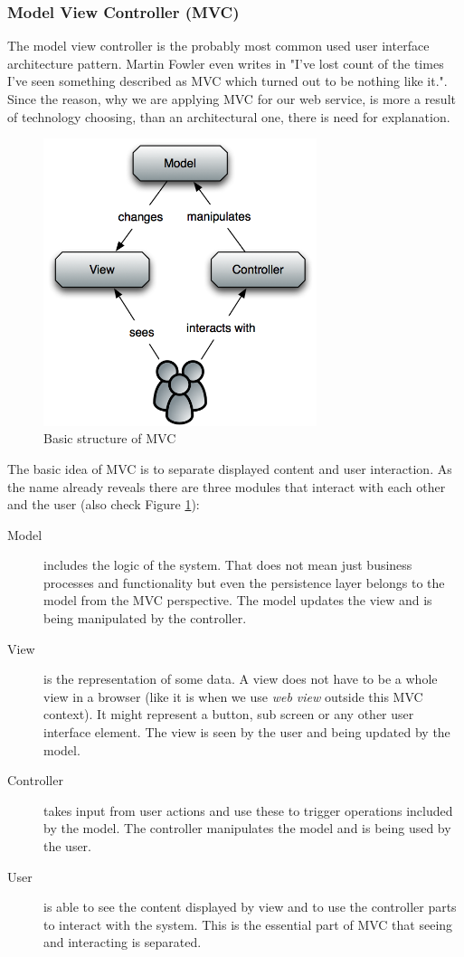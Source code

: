 \subsubsection*{Model View Controller (MVC)}
The model view controller is the probably most common used user interface architecture pattern. Martin Fowler even writes in \cite{fowler2006gui} "I've lost count of the times I've seen something described as MVC which turned out to be nothing like it.". Since the reason, why we are applying MVC for our web service, is more a result of technology choosing, than an architectural one, there is need for explanation.

\begin{figure}\centering
		\includegraphics[width=8cm]{images/mvc-expl.png}
		\caption{Basic structure of MVC}
		\label{mvc-expl}
\end{figure} 


The basic idea of MVC is to separate displayed content and user interaction. As the name already reveals there are three modules that interact with each other and the user (also check Figure \ref{mvc-expl}):

\begin{description}
\item[Model] includes the logic of the system. That does
 not
 mean just business processes and functionality but even the persistence layer belongs to the model from the MVC perspective. 
The model updates the view and is being manipulated by the controller.

\item[View] is the representation of some data. A view does
 not
 have to be a whole view in a browser (like it is when we use \emph{web view} outside this MVC context). It might represent a button, sub screen or any other user interface element.
The view is seen by the user and being updated by the model.

\item[Controller] takes input from user actions and use these to trigger operations included by the model. 
The controller manipulates the model and is being used by the user.

\item[User] is able to see the content displayed by view and to use the controller parts to interact with the system. This is the essential part of MVC that seeing and interacting is separated. 
\end{description}

